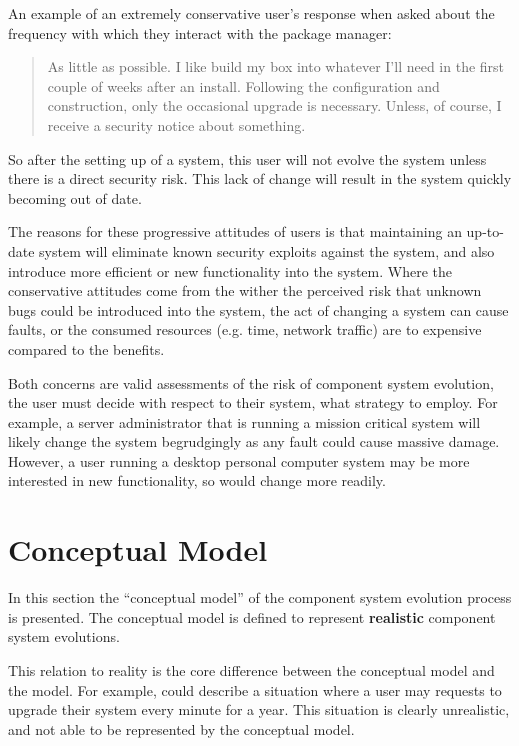 An example of an extremely conservative user's response when asked about the frequency with which they interact with the package manager:
\begin{quotation}
As little as possible. I like build my box into whatever I'll need in the first couple of weeks after an install. 
Following the configuration and construction, only the occasional upgrade is necessary. 
Unless, of course, I receive a security notice about something.
\end{quotation}
So after the setting up of a system, this user will not evolve the system unless there is a direct security risk.
This lack of change will result in the system quickly becoming out of date.

The reasons for these progressive attitudes of users is that maintaining an up-to-date system will eliminate known security exploits against the system,
and also introduce more efficient or new functionality into the system.
Where the conservative attitudes come from the wither the perceived risk that unknown bugs could be introduced into the system, the act of changing a system can cause faults,
or the consumed resources (e.g. time, network traffic) are to expensive compared to the benefits.

Both concerns are valid assessments of the risk of component system evolution, the user must decide with respect to their system, what strategy to employ. 
For example, a server administrator that is running a mission critical system will likely change the system begrudgingly as any fault could cause massive damage.
However, a user running a desktop personal computer system may be more interested in new functionality, so would change more readily.

\section{Conceptual Model}
In this section the ``conceptual model'' of the component system evolution process is presented.
The conceptual model is defined to represent \textbf{realistic} component system evolutions.

This relation to reality is the core difference between the conceptual model and the \modelname model.
For example, \modelname could describe a situation where a user may requests to upgrade their system every minute for a year.
This situation is clearly unrealistic, and not able to be represented by the conceptual model.

